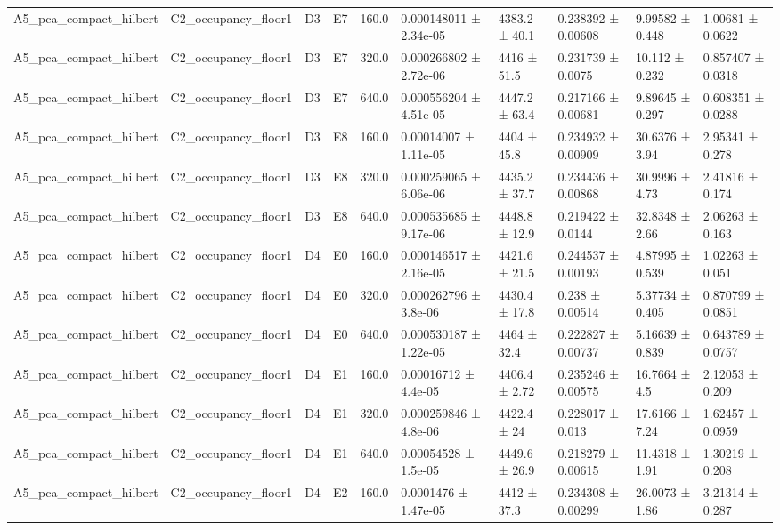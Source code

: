 \begin{table}
\begin{tabular}{llllllllll}
A5\_pca\_compact\_hilbert & C2\_occupancy\_floor1 & D3 & E7 & 160.0 & 0.000148011 ± 2.34e-05 & 4383.2 ± 40.1 & 0.238392 ± 0.00608 & 9.99582 ± 0.448 & 1.00681 ± 0.0622 \\
A5\_pca\_compact\_hilbert & C2\_occupancy\_floor1 & D3 & E7 & 320.0 & 0.000266802 ± 2.72e-06 & 4416 ± 51.5 & 0.231739 ± 0.0075 & 10.112 ± 0.232 & 0.857407 ± 0.0318 \\
A5\_pca\_compact\_hilbert & C2\_occupancy\_floor1 & D3 & E7 & 640.0 & 0.000556204 ± 4.51e-05 & 4447.2 ± 63.4 & 0.217166 ± 0.00681 & 9.89645 ± 0.297 & 0.608351 ± 0.0288 \\
A5\_pca\_compact\_hilbert & C2\_occupancy\_floor1 & D3 & E8 & 160.0 & 0.00014007 ± 1.11e-05 & 4404 ± 45.8 & 0.234932 ± 0.00909 & 30.6376 ± 3.94 & 2.95341 ± 0.278 \\
A5\_pca\_compact\_hilbert & C2\_occupancy\_floor1 & D3 & E8 & 320.0 & 0.000259065 ± 6.06e-06 & 4435.2 ± 37.7 & 0.234436 ± 0.00868 & 30.9996 ± 4.73 & 2.41816 ± 0.174 \\
A5\_pca\_compact\_hilbert & C2\_occupancy\_floor1 & D3 & E8 & 640.0 & 0.000535685 ± 9.17e-06 & 4448.8 ± 12.9 & 0.219422 ± 0.0144 & 32.8348 ± 2.66 & 2.06263 ± 0.163 \\
A5\_pca\_compact\_hilbert & C2\_occupancy\_floor1 & D4 & E0 & 160.0 & 0.000146517 ± 2.16e-05 & 4421.6 ± 21.5 & 0.244537 ± 0.00193 & 4.87995 ± 0.539 & 1.02263 ± 0.051 \\
A5\_pca\_compact\_hilbert & C2\_occupancy\_floor1 & D4 & E0 & 320.0 & 0.000262796 ± 3.8e-06 & 4430.4 ± 17.8 & 0.238 ± 0.00514 & 5.37734 ± 0.405 & 0.870799 ± 0.0851 \\
A5\_pca\_compact\_hilbert & C2\_occupancy\_floor1 & D4 & E0 & 640.0 & 0.000530187 ± 1.22e-05 & 4464 ± 32.4 & 0.222827 ± 0.00737 & 5.16639 ± 0.839 & 0.643789 ± 0.0757 \\
A5\_pca\_compact\_hilbert & C2\_occupancy\_floor1 & D4 & E1 & 160.0 & 0.00016712 ± 4.4e-05 & 4406.4 ± 2.72 & 0.235246 ± 0.00575 & 16.7664 ± 4.5 & 2.12053 ± 0.209 \\
A5\_pca\_compact\_hilbert & C2\_occupancy\_floor1 & D4 & E1 & 320.0 & 0.000259846 ± 4.8e-06 & 4422.4 ± 24 & 0.228017 ± 0.013 & 17.6166 ± 7.24 & 1.62457 ± 0.0959 \\
A5\_pca\_compact\_hilbert & C2\_occupancy\_floor1 & D4 & E1 & 640.0 & 0.00054528 ± 1.5e-05 & 4449.6 ± 26.9 & 0.218279 ± 0.00615 & 11.4318 ± 1.91 & 1.30219 ± 0.208 \\
A5\_pca\_compact\_hilbert & C2\_occupancy\_floor1 & D4 & E2 & 160.0 & 0.0001476 ± 1.47e-05 & 4412 ± 37.3 & 0.234308 ± 0.00299 & 26.0073 ± 1.86 & 3.21314 ± 0.287 \\

\end{tabular}
\end{table}
